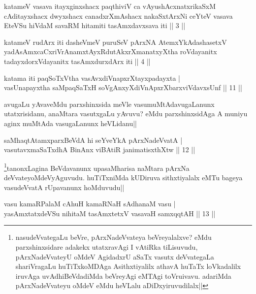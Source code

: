 \begin{shl}
katameV vasava itayxginxshacx paqthiviV ca vAyushAcxnatxrikaSxM cAditayxshacx dwyxshacx canadxrXmAshacx nakaSxtArxNi ceYteV vasava EteVSu hiVdaM savaRM hitamiti tasAmxdavxsava iti || 3 ||
\end{shl}

\begin{shl}
katameV rudArx iti dasheVmeV puruSeV pArxNA AtemxYkAdashasetxV yadAsAmxcaCxriVrAnamxtAyxRdutAkxrXmanatxyXtha roVdayanitx tadayxdorxVdayanitx tasAmxdurxdArx iti || 4 ||
\end{shl}

\begin{shl}
katama iti paqSoTxV\s tha vasAvxdiVnapxrXtayxpadayxta |\\
vasUnapayxtha saMpaqSaTxH soV\s gAnxyXdiVnApxrXbarxviVdavxsUnf \hfill || 11 ||
\end{shl}

\begin{artha}
avugaLu yAvaveMdu parxshinxsida meVle vasumuMtAdavugaLanunx utatxrisidanu, anaMtara vasutxgaLu yAvuvu? eMdu parxshinxsidAga A muniyu aginx muMtAda vasugaLanunx heVLidanu||
\end{artha}

\begin{shl}
saMhaqtAtamxparxBeVdA hi seYveYkA pArxNadeVvatA |\\
vasutavxmaSaTxdhA BinAnx viBAtiR janimatisxthXtw \hfill || 12 ||
\end{shl}

\begin{artha}
\footnote[2]{nasudeVvategaLu beVre, pArxNadeVvateya beVreyalalxve? eMdu parxshinxsidare adakekx utatxravAgi I vAtiRka tiLisuvudu, pArxNadeVvateyU oMdeV AgidadxrU aSaTx vasutx deVvategaLa shariVragaLu huTiTxkoMDAga Asithxtiyalilx athavA huTaTx loVkadalilx iruvAga uvAdhiBeVdadiMda beVreyAgi eMTAgi toVruivavu. adariMda pArxNadeVvateyu oMdeV eMdu heVLalu aDiDxyiruvudilalx||}tanonxLagina BeVdavanunx upasaMharisa naMtara pArxNa deVvateyoMdeVyAguvudu. huTiTxniMda kUDiruva sithxtiyalalx eMTu bageya vasudeVvatA rUpavanunx hoMduvudu||
\end{artha}


\begin{shl}
vasu kamaRPalaM cA\s \s huH kamaRNaH sAdhanaM vasu |\\
yasAmxtatxdeVSu nihitaM tasAmxtetxV vasavaH samxqqtAH \hfill || 13 ||
\end{shl}

